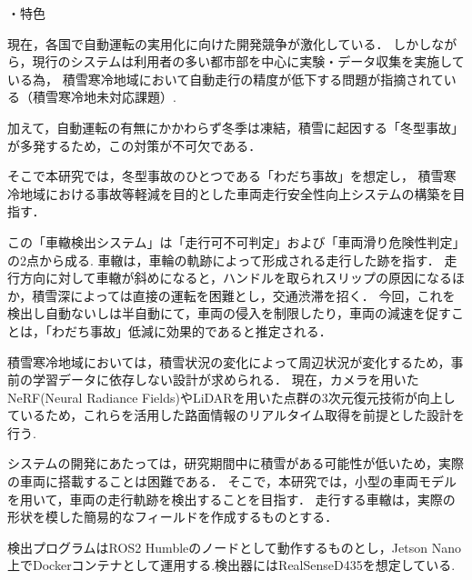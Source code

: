 \documentclass[a4paper]{jarticle}
\begin{document}

%
%
%
%
・特色{
  現在，各国で自動運転の実用化に向けた開発競争が激化している．
	しかしながら，現行のシステムは利用者の多い都市部を中心に実験・データ収集を実施している為，
	積雪寒冷地域において自動走行の精度が低下する問題が指摘されている（積雪寒冷地未対応課題）\cite{tesla}\cite{jigyo}.

	加えて，自動運転の有無にかかわらず冬季は凍結，積雪に起因する「冬型事故」が多発する\cite{hokkaido}ため，この対策が不可欠である．

	そこで本研究では，冬型事故のひとつである「わだち事故」を想定し，
	積雪寒冷地域における事故等軽減を目的とした車両走行安全性向上システムの構築を目指す．
	
	この「車轍検出システム」は「走行可不可判定」および「車両滑り危険性判定」の2点から成る.
	車轍は，車輪の軌跡によって形成される走行した跡を指す．
	走行方向に対して車轍が斜めになると，ハンドルを取られスリップの原因になるほか，積雪深によっては直接の運転を困難とし，交通渋滞を招く．
	今回，これを検出し自動ないしは半自動にて，車両の侵入を制限したり，車両の減速を促すことは，「わだち事故」低減に効果的であると推定される．

	積雪寒冷地域においては，積雪状況の変化によって周辺状況が変化するため，事前の学習データに依存しない設計が求められる．
	現在，カメラを用いたNeRF(Neural Radiance Fields)やLiDARを用いた点群の3次元復元技術が向上しているため，これらを活用した路面情報のリアルタイム取得を前提とした設計を行う.

	システムの開発にあたっては，研究期間中に積雪がある可能性が低いため，実際の車両に搭載することは困難である．
	そこで，本研究では，小型の車両モデルを用いて，車両の走行軌跡を検出することを目指す．
	走行する車轍は，実際の形状を模した簡易的なフィールドを作成するものとする．

	検出プログラムはROS2 Humbleのノードとして動作するものとし，Jetson Nano上でDockerコンテナとして運用する.検出器にはRealSenseD435を想定している.
}
%
%
%
\end{document}
